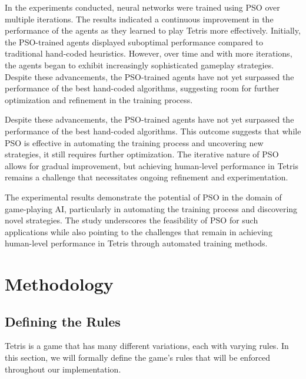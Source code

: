 \documentclass[a4paper, 12pt]{extreport}
\begin{document}
				In the experiments conducted, neural networks were trained using PSO over multiple iterations. The results indicated a continuous improvement in the performance of the agents as they learned to play Tetris more effectively. Initially, the PSO-trained agents displayed suboptimal performance compared to traditional hand-coded heuristics. However, over time and with more iterations, the agents began to exhibit increasingly sophisticated gameplay strategies. Despite these advancements, the PSO-trained agents have not yet surpassed the performance of the best hand-coded algorithms, suggesting room for further optimization and refinement in the training process.
				
				Despite these advancements, the PSO-trained agents have not yet surpassed the performance of the best hand-coded algorithms. This outcome suggests that while PSO is effective in automating the training process and uncovering new strategies, it still requires further optimization. The iterative nature of PSO allows for gradual improvement, but achieving human-level performance in Tetris remains a challenge that necessitates ongoing refinement and experimentation.
				
				The experimental results demonstrate the potential of PSO in the domain of game-playing AI, particularly in automating the training process and discovering novel strategies. The study underscores the feasibility of PSO for such applications while also pointing to the challenges that remain in achieving human-level performance in Tetris through automated training methods.
	
	\chapter{Methodology}
	
		
		\section{Defining the Rules}
			Tetris is a game that has many different variations, each with varying rules. In this section, we will formally define the game's rules that will be enforced throughout our implementation.
			
\end{document}

